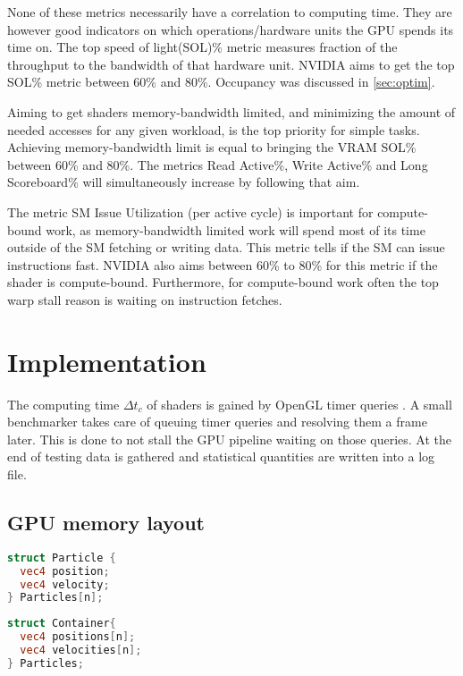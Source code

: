 \documentclass[m,times]{cgMA}
\begin{document}
None of these metrics necessarily have a correlation to computing time. They are however good indicators on which operations/hardware units the GPU spends its time on. The top speed of light(SOL)\% metric measures fraction of the throughput to the bandwidth of that hardware unit. NVIDIA aims to get the top SOL\% metric between 60\% and 80\%. Occupancy was discussed in \ref{sec:optim}. \cite{NVIDIA:PEAK_PERFORMANCE}

Aiming to get shaders memory-bandwidth limited, and minimizing the amount of needed accesses for any given workload, is the top priority for simple tasks. Achieving memory-bandwidth limit is equal to bringing the VRAM SOL\% between 60\% and 80\%. The metrics Read Active\%, Write Active\% and Long Scoreboard\% will simultaneously increase by following that aim.

The metric SM Issue Utilization (per active cycle) is important for compute-bound work, as memory-bandwidth limited work will spend most of its time outside of the SM fetching or writing data. This metric tells if the SM can issue instructions fast. NVIDIA also aims between 60\% to 80\% for this metric if the shader is compute-bound. Furthermore, for compute-bound work often the top warp stall reason is waiting on instruction fetches.

\clearpage
\section{Implementation}\label{sec:implementation}
The computing time $\Delta t_c$ of shaders is gained by OpenGL timer queries \cite{KHRONOS:TIMER_QUERY}. A small benchmarker takes care of queuing timer queries and resolving them a frame later. This is done to not stall the GPU pipeline waiting on those queries. At the end of testing data is gathered and statistical quantities are written into a log file.
\subsection{GPU memory layout}\label{sec:soa_aos}
\noindent\begin{minipage}{0.45\textwidth}
\begin{lstlisting}[caption={AoS-Layout},language={GLSL},style={GL}]
struct Particle {
  vec4 position;
  vec4 velocity;
} Particles[n];
\end{lstlisting}
\end{minipage}
\hfill\noindent\begin{minipage}{0.45\textwidth}
\begin{lstlisting}[caption={SoA-Layout},label={llst:soa},language={GLSL},style={GL}]
struct Container{
  vec4 positions[n];
  vec4 velocities[n];
} Particles;
\end{lstlisting}
\end{minipage}
\end{document}
